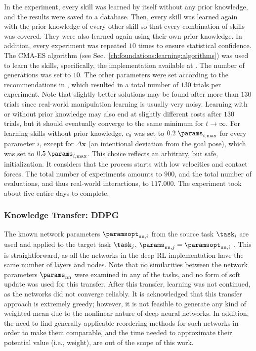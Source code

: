 In the \skillmodelabbr{} experiment, every skill was learned by itself without any prior knowledge, and the results were saved to a database.
Then, every skill was learned again with the prior knowledge of every other skill so that every combination of skills was covered.
They were also learned again using their own prior knowledge.
In addition, every experiment was repeated $10$ times to ensure statistical confidence.
The CMA-ES algorithm (see Sec.~\ref{ch:foundations:learning:algorithms}) was used to learn the skills, specifically, the implementation available at \cite{FrancoisMicheldeRainville.15.02.2021}.
The number of generations was set to $10$.
The other parameters were set according to the recommendations in \cite{FrancoisMicheldeRainville.15.02.2021}, which resulted in a total number of $130$ trials per experiment.
Note that slightly better solutions may be found after more than $130$ trials since real-world manipulation learning is usually very noisy.
Learning with or without prior knowledge may also end at slightly different costs after $130$ trials, but it should eventually converge to the same minimum for $t\rightarrow \infty$.
For learning skills without prior knowledge, $c_0$ was set to $0.2 \; \params_{i,\text{max}}$ for every parameter $i$, except for $\Delta \boldsymbol{x}$ (an intentional deviation from the goal pose), which was set to $0.5\; \params_{i,\text{max}}$.
This choice reflects an arbitrary, but safe, initialization.
It considers that the process starts with low velocities and contact forces.
The total number of experiments amounts to $900$, and the total number of evaluations, and thus real-world interactions, to $117.000$.
The experiment took about five entire days to complete.

\subsubsection{Knowledge Transfer: DDPG}

The known network parameters $\paramsopt_{\mathrm{nn},i}$ from the source task $\task_i$ are used and applied to the target task $\task_j$, $\params_{\mathrm{nn},j}=\paramsopt_{\mathrm{nn},i}$ .
This is straightforward, as all the networks in the deep RL implementation have the same number of layers and nodes.
Note that no similarities between the network parameters $\params_{\mathrm{nn}}$ were examined in any of the tasks, and no form of soft update was used for this transfer.
After this transfer, learning was not continued, as the networks did not converge reliably.
It is acknowledged that this transfer approach is extremely greedy; however, it is not feasible to generate any kind of weighted mean due to the nonlinear nature of deep neural networks.
In addition, the need to find generally applicable reordering methods for such networks in order to make them comparable, and the time needed to approximate their potential value (i.e., weight), are out of the scope of this work.

